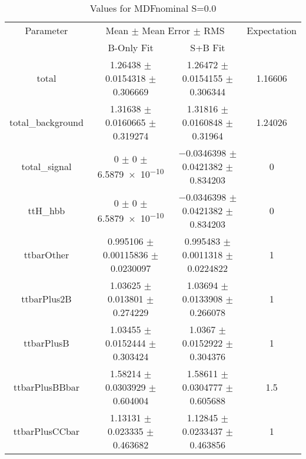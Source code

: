 \begin{table}
\centering
\caption{Values for MDFnominal S=0.0}
\begin{tabular}{cccc}
\toprule
Parameter & \multicolumn{2}{c}{Mean $\pm$ Mean Error $\pm$ RMS} & Expectation\\
 & B-Only Fit & S+B Fit & \\
\midrule
total & \num{1.26438} $\pm$ \num{0.0154318} $\pm$ \num{0.306669} & \num{1.26472} $\pm$ \num{0.0154155} $\pm$ \num{0.306344} & \num{1.16606}\\
total\_background & \num{1.31638} $\pm$ \num{0.0160665} $\pm$ \num{0.319274} & \num{1.31816} $\pm$ \num{0.0160848} $\pm$ \num{0.31964} & \num{1.24026}\\
total\_signal & \num{0} $\pm$ \num{0} $\pm$ \num{6.5879e-10} & \num{-0.0346398} $\pm$ \num{0.0421382} $\pm$ \num{0.834203} & \num{0}\\
ttH\_hbb & \num{0} $\pm$ \num{0} $\pm$ \num{6.5879e-10} & \num{-0.0346398} $\pm$ \num{0.0421382} $\pm$ \num{0.834203} & \num{0}\\
ttbarOther & \num{0.995106} $\pm$ \num{0.00115836} $\pm$ \num{0.0230097} & \num{0.995483} $\pm$ \num{0.0011318} $\pm$ \num{0.0224822} & \num{1}\\
ttbarPlus2B & \num{1.03625} $\pm$ \num{0.013801} $\pm$ \num{0.274229} & \num{1.03694} $\pm$ \num{0.0133908} $\pm$ \num{0.266078} & \num{1}\\
ttbarPlusB & \num{1.03455} $\pm$ \num{0.0152444} $\pm$ \num{0.303424} & \num{1.0367} $\pm$ \num{0.0152922} $\pm$ \num{0.304376} & \num{1}\\
ttbarPlusBBbar & \num{1.58214} $\pm$ \num{0.0303929} $\pm$ \num{0.604004} & \num{1.58611} $\pm$ \num{0.0304777} $\pm$ \num{0.605688} & \num{1.5}\\
ttbarPlusCCbar & \num{1.13131} $\pm$ \num{0.023335} $\pm$ \num{0.463682} & \num{1.12845} $\pm$ \num{0.0233437} $\pm$ \num{0.463856} & \num{1}\\
\bottomrule
\end{tabular}
\end{table}